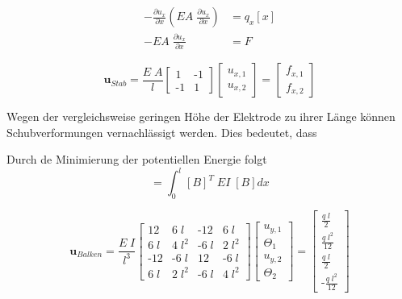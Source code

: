 \begin{align}
   - \frac{\partial u_x}{\partial x} \left( EA\; \frac{\partial u_x}{\partial x} \right) &= q_x[x]\\
    -EA\; \frac{\partial u_x}{\partial x} &= F
\end{align}

\begin{equation}
   [K_{\text{Stab}}] \boldsymbol{u}_{Stab} = \frac{E \; A}{l} 
   \begin{bmatrix}
    1 & \text{-}1 \\
    \text{-}1 & 1
   \end{bmatrix}
   \begin{bmatrix}
    u_{x,1} \\
    u_{x,2}
   \end{bmatrix}
   = 
   \begin{bmatrix}
    f_{x,1} \\
    f_{x,2}
   \end{bmatrix}
\end{equation}

Wegen der vergleichsweise geringen Höhe der Elektrode zu ihrer Länge können Schubverformungen vernachlässigt werden. Dies bedeutet, dass 


Durch de Minimierung der potentiellen Energie folgt
\begin{equation}
    [k] = \int_0^l [B]^T \; EI \; [B] dx
\end{equation}

\begin{equation}
    [K_{\text{Balken}}] \boldsymbol{u}_{Balken} = \frac{E \; I}{l^3} 
    \begin{bmatrix}
        12 & 6 \; l & \text{-}12 & 6 \; l        \\
        6 \; l & 4 \; l^2 & \text{-}6 \; l & 2 \; l^2 \\
        \text{-}12 & \text{-}6 \; l & 12 & \text{-}6 \; l      \\
        6 \; l & 2 \; l^2 & \text{-}6 \; l & 4 \; l^2
    \end{bmatrix}
    \begin{bmatrix}
        u_{y,1}  \\
        \Theta_1 \\
        u_{y,2}  \\
        \Theta_2
    \end{bmatrix}
    = 
    \begin{bmatrix}
        \frac{q \; l}{2}  \\
        \frac{q \; l^2}{12} \\
        \frac{q \; l}{2}  \\
        \text{-}\frac{q \; l^2}{12}
    \end{bmatrix} 
\end{equation}

